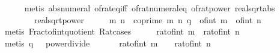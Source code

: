 \begin{isabellebody}
\ \ \ \ \isamarkupfalse%
\ {\isacharparenleft}{\kern0pt}metis\ abs{\isacharunderscore}{\kern0pt}numeral\ of{\isacharunderscore}{\kern0pt}rat{\isacharunderscore}{\kern0pt}eq{\isacharunderscore}{\kern0pt}iff\ of{\isacharunderscore}{\kern0pt}rat{\isacharunderscore}{\kern0pt}numeral{\isacharunderscore}{\kern0pt}eq\ of{\isacharunderscore}{\kern0pt}rat{\isacharunderscore}{\kern0pt}power\ real{\isacharunderscore}{\kern0pt}sqrt{\isacharunderscore}{\kern0pt}abs\ \isanewline
\ \ \ \ \ \ \ \ real{\isacharunderscore}{\kern0pt}sqrt{\isacharunderscore}{\kern0pt}power{\isacharparenright}{\kern0pt}\isanewline
\ \ \isamarkupfalse%
\ \isamarkupfalse%
\ m\ n\ \ {\isachardoublequoteopen}coprime\ m\ n{\isachardoublequoteclose}\ {\isachardoublequoteopen}q\ {\isacharequal}{\kern0pt}\ of{\isacharunderscore}{\kern0pt}int\ m\ {\isacharslash}{\kern0pt}\ of{\isacharunderscore}{\kern0pt}int\ n{\isachardoublequoteclose}\isanewline
\ \ \ \ \isamarkupfalse%
\ {\isacharparenleft}{\kern0pt}metis\ Fract{\isacharunderscore}{\kern0pt}of{\isacharunderscore}{\kern0pt}int{\isacharunderscore}{\kern0pt}quotient\ Rat{\isacharunderscore}{\kern0pt}cases{\isacharparenright}{\kern0pt}\isanewline
\ \ \isamarkupfalse%
\ \isamarkupfalse%
\ {\isachardoublequoteopen}{\isacharparenleft}{\kern0pt}rat{\isacharunderscore}{\kern0pt}of{\isacharunderscore}{\kern0pt}int\ m{\isacharparenright}{\kern0pt}\ {\isacharslash}{\kern0pt}\ {\isacharparenleft}{\kern0pt}rat{\isacharunderscore}{\kern0pt}of{\isacharunderscore}{\kern0pt}int\ n{\isacharparenright}{\kern0pt}\ {\isacharequal}{\kern0pt}\ {}{\isachardoublequoteclose}\isanewline
\ \ \ \ \isamarkupfalse%
\ {\isacharparenleft}{\kern0pt}metis\ {\isacartoucheopen}q\ {\isacharequal}{\kern0pt}\ {}{\isacartoucheclose}\ power{\isacharunderscore}{\kern0pt}divide{\isacharparenright}{\kern0pt}\isanewline
\ \ \isamarkupfalse%
\ \isamarkupfalse%
\ {}{\isacharcolon}{\kern0pt}\ {\isachardoublequoteopen}{\isacharparenleft}{\kern0pt}rat{\isacharunderscore}{\kern0pt}of{\isacharunderscore}{\kern0pt}int\ m{\isacharparenright}{\kern0pt}\ {\isacharequal}{\kern0pt}\ {}\ {\isacharasterisk}{\kern0pt}\ {\isacharparenleft}{\kern0pt}rat{\isacharunderscore}{\kern0pt}of{\isacharunderscore}{\kern0pt}int\ n{\isacharparenright}{\kern0pt}\isanewline

\end{isabellebody}
